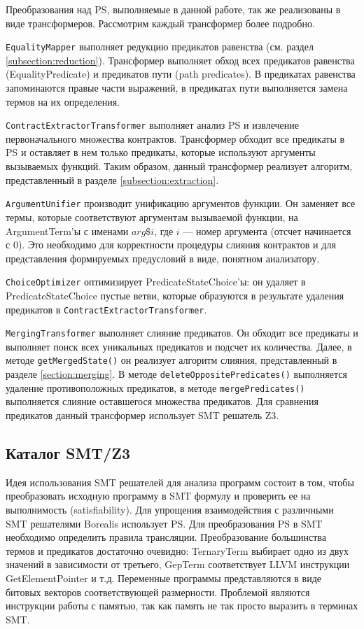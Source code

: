Преобразования над PS, выполняемые в данной работе, так же реализованы в виде трансформеров. Рассмотрим каждый трансформер более подробно.

\texttt{EqualityMapper} выполняет редукцию предикатов равенства (см. раздел \ref{subsection:reduction}). Трансформер выполняет обход всех предикатов равенства (EqualityPredicate) и предикатов пути (path predicates). В предикатах равенства запоминаются правые части выражений, в предикатах пути выполняется замена термов на их определения.

\texttt{ContractExtractorTransformer} выполняет анализ PS и извлечение первоначального множества контрактов. Трансформер обходит все предикаты в PS и оставляет в нем только предикаты, которые используют аргументы вызываемых функций. Таким образом, данный трансформер реализует алгоритм, представленный в разделе \ref{subsection:extraction}.

\texttt{ArgumentUnifier} производит унификацию аргументов функции. Он заменяет все термы, которые соответствуют аргументам вызываемой функции, на ArgumentTerm'ы с именами $arg\$i$, где $i$ --- номер аргумента (отсчет начинается с 0). Это необходимо для корректности процедуры слияния контрактов и для представления формируемых предусловий в виде, понятном анализатору.

\texttt{ChoiceOptimizer} оптимизирует PredicateStateChoice'ы: он удаляет в PredicateStateChoice пустые ветви, которые образуются в результате удаления предикатов в \texttt{ContractExtractorTransformer}.

\texttt{MergingTransformer} выполняет слияние предикатов. Он обходит все предикаты и выполняет поиск всех уникальных предикатов и подсчет их количества. Далее, в методе \texttt{getMergedState()} он реализует алгоритм слияния, представленный в разделе \ref{section:merging}. В методе \texttt{deleteOppositePredicates()} выполняется удаление противоположных предикатов, в методе \texttt{mergePredicates()} выполняется слияние оставшегося множества предикатов. Для сравнения предикатов данный трансформер использует SMT решатель Z3\cite{z3solver}.

\subsection{Каталог SMT/Z3}
Идея использования SMT решателей для анализа программ состоит в том, чтобы преобразовать исходную программу в SMT формулу и проверить ее на выполнимость (satisfiability). Для упрощения взаимодействия с различными SMT решателями Borealis использует PS. Для преобразования PS в SMT необходимо определить правила трансляции. Преобразование большинства термов и предикатов достаточно очевидно: TernaryTerm выбирает одно из двух значений в зависимости от третьего, GepTerm соответствует LLVM инструкции GetElementPointer и т.д. Переменные программы представляются в виде битовых векторов соответствующей размерности. Проблемой являются инструкции работы с памятью, так как память не так просто выразить в терминах SMT.


